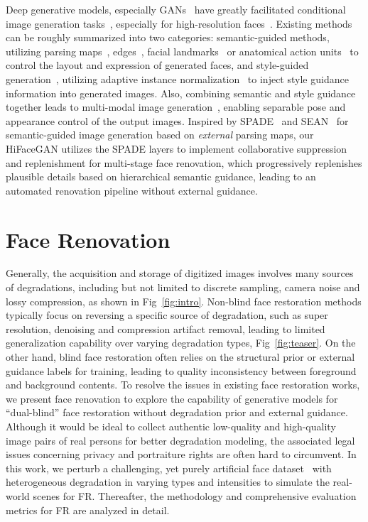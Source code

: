 \documentclass[sigconf]{acmart}
\begin{document}
Deep generative models, especially GANs~\cite{gan} have greatly facilitated conditional image generation tasks~\cite{pix2pix}\cite{cyclegan}, especially for high-resolution faces~\cite{progressivegan}\cite{stylegan_ffhq}\cite{stylegan2}. Existing methods can be roughly summarized into two categories: semantic-guided methods, utilizing parsing maps~\cite{pix2pixHD}, edges~\cite{vid2vid}, facial landmarks~\cite{SuperFAN} or anatomical action units~\cite{GANimation} to control the layout and expression of generated faces, and style-guided generation~\cite{stylegan_ffhq}\cite{stylegan2}, utilizing adaptive instance normalization~\cite{adain} to inject style guidance information into generated images. Also, combining semantic and style guidance together leads to multi-modal image generation~\cite{bicyclegan}, enabling separable pose and appearance control of the output images. Inspired by SPADE~\cite{spade} and SEAN~\cite{sean} for semantic-guided image generation based on \emph{external} parsing maps, our HiFaceGAN utilizes the SPADE layers to implement collaborative suppression and replenishment for multi-stage face renovation, which progressively replenishes plausible details based on hierarchical semantic guidance, leading to an automated renovation pipeline without external guidance.

\section{Face Renovation}\label{sec:face_renovation}
Generally, the acquisition and storage of digitized images involves many sources of degradations, including but not limited to discrete sampling, camera noise and lossy compression, as shown in Fig~\ref{fig:intro}. Non-blind face restoration methods typically focus on reversing a specific source of degradation, such as super resolution, denoising and compression artifact removal, leading to limited generalization capability over varying degradation types, Fig~\ref{fig:teaser}. On the other hand, blind face restoration often relies on the structural prior or external guidance labels for training, leading to quality inconsistency between foreground and background contents.
To resolve the issues in existing face restoration works, we present face renovation to explore the capability of generative models for ``dual-blind'' face restoration without degradation prior and external guidance.
Although it would be ideal to collect authentic low-quality and high-quality image pairs of real persons for better degradation modeling, the associated legal issues concerning privacy and portraiture rights are often hard to circumvent.
In this work, we perturb a challenging, yet purely artificial face dataset~\cite{stylegan_ffhq} with heterogeneous degradation in varying types and intensities to simulate the real-world scenes for FR. Thereafter, the methodology and comprehensive evaluation metrics for FR are analyzed in detail.
\end{document}
